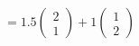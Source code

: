 \documentclass[preview]{standalone}
\begin{document}
\begin{align*}
= 1.5 \begin{pmatrix} 2 \\ 1 \end{pmatrix} + 1 \begin{pmatrix} 1 \\ 2 \end{pmatrix}
\end{align*}
\end{document}

